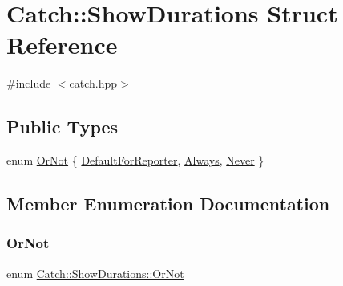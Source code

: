 \hypertarget{struct_catch_1_1_show_durations}{}\section{Catch\+:\+:Show\+Durations Struct Reference}
\label{struct_catch_1_1_show_durations}


{\ttfamily \#include $<$catch.\+hpp$>$}

\subsection*{Public Types}
\begin{DoxyCompactItemize}
\item 
enum \mbox{\hyperlink{struct_catch_1_1_show_durations_a82fa0174554187220c1eda175f122ee1}{Or\+Not}} \{ \mbox{\hyperlink{struct_catch_1_1_show_durations_a82fa0174554187220c1eda175f122ee1aba1710583107b0736c1f5f0f8dfd23c8}{Default\+For\+Reporter}}, 
\mbox{\hyperlink{struct_catch_1_1_show_durations_a82fa0174554187220c1eda175f122ee1ab49682ccb55f2d6b4dfcdb027c09da9a}{Always}}, 
\mbox{\hyperlink{struct_catch_1_1_show_durations_a82fa0174554187220c1eda175f122ee1af1a716bc46185f561382a12a0dede9f3}{Never}}
 \}
\end{DoxyCompactItemize}


\subsection{Member Enumeration Documentation}
\mbox{\label{struct_catch_1_1_show_durations_a82fa0174554187220c1eda175f122ee1}} 
\subsubsection{\texorpdfstring{Or\+Not}{OrNot}}
{\footnotesize\ttfamily enum \mbox{\hyperlink{struct_catch_1_1_show_durations_a82fa0174554187220c1eda175f122ee1}{Catch\+::\+Show\+Durations\+::\+Or\+Not}}}

